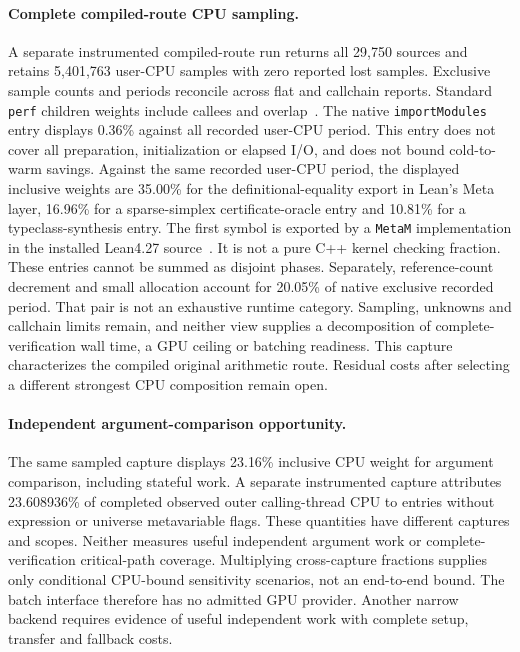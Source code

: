 \documentclass[10pt,twocolumn]{article}
\begin{document}
\paragraph{Complete compiled-route CPU sampling.}
A separate instrumented compiled-route run returns all 29,750 sources and
retains 5,401,763 user-CPU samples with zero reported lost samples.
Exclusive sample counts and periods reconcile across flat and callchain
reports. Standard \texttt{perf} children weights include callees and
overlap~\cite{perfReport}.
The native \texttt{importModules} entry displays 0.36\% against all recorded
user-CPU period. This entry does not cover all preparation, initialization or
elapsed I/O, and does not bound cold-to-warm savings.
Against the same recorded user-CPU period, the displayed inclusive weights are
35.00\% for the definitional-equality export in Lean's Meta layer,
16.96\% for a sparse-simplex certificate-oracle entry and
10.81\% for a typeclass-synthesis entry.
The first symbol is exported by a \texttt{MetaM} implementation in the
installed Lean4.27 source~\cite{lean427MetaDefEq}. It is not a pure C++ kernel
checking fraction. These entries cannot be summed as disjoint phases.
Separately, reference-count decrement and small allocation account for
20.05\% of native exclusive recorded period. That pair is not an exhaustive
runtime category. Sampling, unknowns and callchain limits remain, and neither
view supplies a decomposition of complete-verification wall time, a GPU ceiling or batching readiness.
This capture characterizes the compiled original arithmetic route. Residual
costs after selecting a different strongest CPU composition remain open.

\paragraph{Independent argument-comparison opportunity.}
The same sampled capture displays 23.16\% inclusive CPU weight for argument
comparison, including stateful work. A separate instrumented capture attributes
23.608936\% of completed observed outer calling-thread CPU to entries without
expression or universe metavariable flags. These quantities have different
captures and scopes. Neither measures useful independent argument work or
complete-verification critical-path coverage. Multiplying cross-capture
fractions supplies only conditional CPU-bound sensitivity scenarios, not an
end-to-end bound. The batch interface therefore has no admitted GPU provider.
Another narrow backend requires evidence of useful independent work with
complete setup, transfer and fallback costs.
\end{document}
